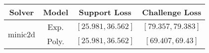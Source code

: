 \begin{tabular}{cc|c|c} 
\hline 
 Solver & Model & Support Loss  & Challenge Loss \tabularnewline\hline 
\hline 
\multirow{2}{*}{minic2d} & Exp. & $\left[25.981,36.562\right]$ & $\left[79.357,79.383\right]$ \tabularnewline 
 & Poly. & $\mathbf{\left[25.981,36.562\right]}$ & $\mathbf{\left[69.407,69.43\right]}$ \tabularnewline 
\hline 
\end{tabular} 


